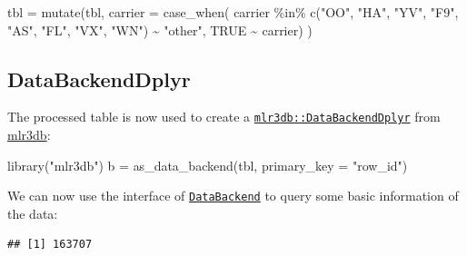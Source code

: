 \documentclass[
]{scrbook}
\newenvironment{Shaded}{\begin{snugshade}}{\end{snugshade}}
\newcommand{\AttributeTok}[1]{\textcolor[rgb]{0.77,0.63,0.00}{#1}}
\newcommand{\ConstantTok}[1]{\textcolor[rgb]{0.00,0.00,0.00}{#1}}
\newcommand{\FunctionTok}[1]{\textcolor[rgb]{0.00,0.00,0.00}{#1}}
\newcommand{\NormalTok}[1]{#1}
\newcommand{\OtherTok}[1]{\textcolor[rgb]{0.56,0.35,0.01}{#1}}
\newcommand{\SpecialCharTok}[1]{\textcolor[rgb]{0.00,0.00,0.00}{#1}}
\newcommand{\StringTok}[1]{\textcolor[rgb]{0.31,0.60,0.02}{#1}}
\renewenvironment{Shaded} {\begin{snugshade}\small} {\end{snugshade}}
\begin{document}
\begin{Shaded}
\begin{Highlighting}[]
\NormalTok{tbl }\OtherTok{=} \FunctionTok{mutate}\NormalTok{(tbl, }\AttributeTok{carrier =} \FunctionTok{case\_when}\NormalTok{(}
\NormalTok{    carrier }\SpecialCharTok{\%in\%} \FunctionTok{c}\NormalTok{(}\StringTok{"OO"}\NormalTok{, }\StringTok{"HA"}\NormalTok{, }\StringTok{"YV"}\NormalTok{, }\StringTok{"F9"}\NormalTok{, }\StringTok{"AS"}\NormalTok{, }\StringTok{"FL"}\NormalTok{, }\StringTok{"VX"}\NormalTok{, }\StringTok{"WN"}\NormalTok{) }\SpecialCharTok{\textasciitilde{}} \StringTok{"other"}\NormalTok{,}
    \ConstantTok{TRUE} \SpecialCharTok{\textasciitilde{}}\NormalTok{ carrier)}
\NormalTok{)}
\end{Highlighting}
\end{Shaded}

\hypertarget{databackenddplyr}{%
\subsection{DataBackendDplyr}\label{databackenddplyr}}

The processed table is now used to create a \href{https://mlr3db.mlr-org.com/reference/DataBackendDplyr.html}{\texttt{mlr3db::DataBackendDplyr}} from \href{https://mlr3db.mlr-org.com}{mlr3db}:

\begin{Shaded}
\begin{Highlighting}[]
\FunctionTok{library}\NormalTok{(}\StringTok{"mlr3db"}\NormalTok{)}
\NormalTok{b }\OtherTok{=} \FunctionTok{as\_data\_backend}\NormalTok{(tbl, }\AttributeTok{primary\_key =} \StringTok{"row\_id"}\NormalTok{)}
\end{Highlighting}
\end{Shaded}

We can now use the interface of \href{https://mlr3.mlr-org.com/reference/DataBackend.html}{\texttt{DataBackend}} to query some basic information of the data:

\begin{Shaded}
\end{Shaded}

\begin{verbatim}
## [1] 163707
\end{verbatim}

\begin{Shaded}
\end{Shaded}
\end{document}

